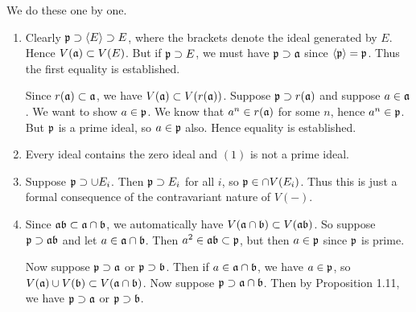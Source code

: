 \documentclass[11pt, english]{article}
\begin{document}
\begin{sol}
We do these one by one.
\begin{enumerate}
\item Clearly $\mathfrak{p} \supset \langle E \rangle \supset E$, where the brackets denote the ideal generated by $E$. Hence $V(\mathfrak{a}) \subset V(E)$. But if $\mathfrak{p} \supset E$, we must have $\mathfrak{p} \supset \mathfrak{a}$ since $\langle \mathfrak{p} \rangle = \mathfrak{p}$. Thus the first equality is established.

Since $r(\mathfrak{a}) \subset \mathfrak{a}$, we have $V(\mathfrak{a}) \subset V(r(\mathfrak{a}))$. Suppose $\mathfrak{p} \supset r(\mathfrak{a})$ and suppose $a \in \mathfrak{a}$. We want to show $a \in \mathfrak{p}$. We know that $a^n \in r(\mathfrak{a})$ for some $n$, hence $a^n \in \mathfrak{p}$. But $\mathfrak{p}$ is a prime ideal, so $a \in \mathfrak{p}$ also. Hence equality is established.
\item Every ideal contains the zero ideal and $(1)$ is not a prime ideal.
\item Suppose $\mathfrak{p} \supset \cup E_i$. Then $\mathfrak{p} \supset E_i$ for all $i$, so $\mathfrak{p} \in \cap V(E_i)$. Thus this is just a formal consequence of the contravariant nature of $V(-)$.
\item Since $\mathfrak{a} \mathfrak{b}  \subset \mathfrak{a} \cap \mathfrak{b}$, we automatically have $V(\mathfrak{a} \cap \mathfrak{b}) \subset V(\mathfrak{a} \mathfrak{b})$. So suppose $\mathfrak{p} \supset \mathfrak{a} \mathfrak{b}$ and let $a \in \mathfrak{a} \cap \mathfrak{b}$. Then $a^2 \in \mathfrak{a} \mathfrak{b} \subset \mathfrak{p}$, but then $a \in \mathfrak{p}$ since $\mathfrak{p}$ is prime.

Now suppose $\mathfrak{p} \supset \mathfrak{a}$ or $\mathfrak{p} \supset \mathfrak{b}$. Then if $a \in \mathfrak{a} \cap \mathfrak{b}$, we have $a \in \mathfrak{p}$, so $V(\mathfrak{a}) \cup V(\mathfrak{b}) \subset V(\mathfrak{a} \cap \mathfrak{b})$. Now suppose $\mathfrak{p} \supset \mathfrak{a} \cap \mathfrak{b}$. Then by Proposition 1.11, we have $\mathfrak{p} \supset \mathfrak{a}$ or $\mathfrak{p} \supset \mathfrak{b}$. 
\end{enumerate}
\end{sol}
\end{document}
